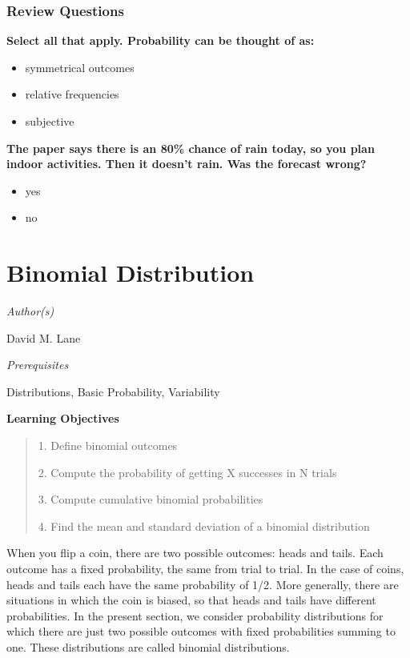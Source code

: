 \documentclass[
  11pt,
,
onecolumn,
openany
]{book}
\begin{document}
\hypertarget{review-questions}{%
\subsection{Review Questions}\label{review-questions}}

\textbf{Select all that apply. Probability can be thought of as:}

\begin{itemize}
\item
  symmetrical outcomes
\item
  relative frequencies
\item
  subjective
\end{itemize}

\textbf{The paper says there is an 80\% chance of rain today, so you plan
indoor activities. Then it doesn't rain. Was the forecast wrong?}

\begin{itemize}
\item
  yes
\item
  no
\end{itemize}

\hypertarget{binomial-distribution}{%
\chapter{Binomial Distribution}\label{binomial-distribution}}

\emph{Author(s)}

David M. Lane

\emph{Prerequisites}

Distributions, Basic Probability, Variability

\textbf{Learning Objectives}

\begin{quote}
1. Define binomial outcomes

2. Compute the probability of getting X successes in N trials

3. Compute cumulative binomial probabilities

4. Find the mean and standard deviation of a binomial distribution
\end{quote}

When you flip a coin, there are two possible outcomes: heads and tails. Each
outcome has a fixed probability, the same from trial to trial. In the case of
coins, heads and tails each have the same probability of 1/2. More generally,
there are situations in which the coin is biased, so that heads and tails have
different probabilities. In the present section, we consider probability
distributions for which there are just two possible outcomes with fixed
probabilities summing to one. These distributions are called binomial
distributions.
\end{document}
